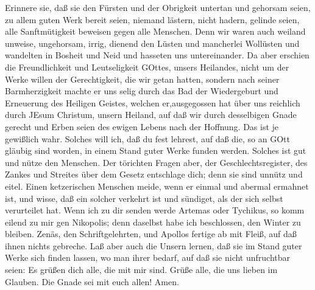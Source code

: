  Erinnere sie, daß sie den Fürsten und der Obrigkeit
untertan und gehorsam seien, zu allem guten Werk bereit seien,
 niemand lästern, nicht hadern, gelinde seien, alle
Sanftmütigkeit beweisen gegen alle Menschen.  Denn wir waren
auch weiland unweise, ungehorsam, irrig, dienend den Lüsten und
mancherlei Wollüsten und wandelten in Bosheit und Neid und hasseten uns
untereinander.  Da aber erschien die Freundlichkeit und
Leutseligkeit GOttes, unsers Heilandes,  nicht um der Werke
willen der Gerechtigkeit, die wir getan hatten, sondern nach seiner
Barmherzigkeit machte er uns selig durch das Bad der Wiedergeburt und
Erneuerung des Heiligen Geistes,  welchen er,ausgegossen hat
über uns reichlich durch JEsum Christum, unsern Heiland, 
auf daß wir durch desselbigen Gnade gerecht und Erben seien des ewigen
Lebens nach der Hoffnung.  Das ist je gewißlich wahr.
Solches will ich, daß du fest lehrest, auf daß die, so an GOtt gläubig
sind worden, in einem Stand guter Werke funden werden. Solches ist gut
und nütze den Menschen.  Der törichten Fragen aber, der
Geschlechtsregister, des Zankes und Streites über dem Gesetz entschlage
dich; denn sie sind unnütz und eitel.  Einen ketzerischen
Menschen meide, wenn er einmal und abermal ermahnet ist, 
und wisse, daß ein solcher verkehrt ist und sündiget, als der sich
selbst verurteilet hat.  Wenn ich zu dir senden werde
Artemas oder Tychikus, so komm eilend zu mir gen Nikopolis; denn
daselbst habe ich beschlossen, den Winter zu bleiben. 
Zenäs, den Schriftgelehrten, und Apollos fertige ab mit Fleiß, auf daß
ihnen nichts gebreche.  Laß aber auch die Unsern lernen,
daß sie im Stand guter Werke sich finden lassen, wo man ihrer bedarf,
auf daß sie nicht unfruchtbar seien:  Es grüßen dich alle,
die mit mir sind. Grüße alle, die uns lieben im Glauben. Die Gnade sei
mit euch allen! Amen.
